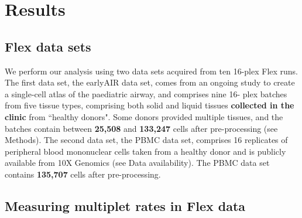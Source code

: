 \documentclass[unnumsec,webpdf,modern,large]{oup-authoring-template}
\begin{document}
	 
	\section{Results}
	\label{sec:results}
	
	\subsection{Flex data sets}
	\label{subsec: data}
	
	We perform our analysis using two data sets acquired from ten 16-plex Flex runs. 
	The first data set, the earlyAIR data set, comes from an ongoing study to create a single-cell atlas of the paediatric airway, and comprises nine 16- plex batches from five tissue types, comprising both solid and liquid tissues \textbf{collected in the clinic} from ``healthy donors". 
	Some donors provided multiple tissues, and the batches contain between \textbf{25,508} and \textbf{133,247} cells after pre-processing (see Methods). 
	The second data set, the PBMC data set, comprises 16 replicates of peripheral blood mononuclear cells taken from a healthy donor and is publicly available from 10X Genomics (see Data availability).  
	The PBMC data set contains \textbf{135,707} cells after pre-processing.
	
	\subsection{Measuring multiplet rates in Flex data}
	
\end{document}
